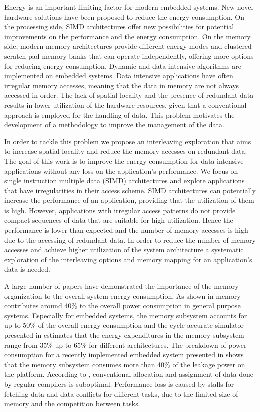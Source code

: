 Energy is an important limiting factor for modern embedded systems.
New novel hardware solutions have been proposed to reduce the energy consumption.
On the processing side, SIMD architectures offer new possibilities for potential improvements on the performance and the energy consumption.
On the memory side, modern memory architectures provide different energy modes and clustered scratch-pad memory banks that can operate independently, offering more options for reducing energy consumption.
Dynamic and data intensive algorithms are implemented on embedded systems.
Data intensive applications have often irregular memory accesses, meaning that the data in memory are not always accessed in order.
The lack of spatial locality and the presence of redundant data results in lower utilization of the hardware resources, given that a conventional approach is employed for the handling of data.
This problem motivates the development of a methodology to improve the management of the data.

In order to tackle this problem we propose an interleaving exploration that aims to increase spatial locality and reduce the memory accesses on redundant data.
The goal of this work is to improve the energy consumption for data intensive applications without any loss on the application's performance. 
We focus on single instruction multiple data (SIMD) architectures and explore applications that have irregularities in their access scheme. 
SIMD architectures can potentially increase the performance of an application, providing that the utilization of them is high. 
However, applications with irregular access patterns do not provide compact sequences of data that are suitable for high utilization. 
Hence the performance is lower than expected and the number of memory accesses is high due to the accessing of redundant data. 
In order to reduce the number of memory accesses and achieve higher utilization of the system architecture a systematic exploration of the interleaving options and memory mapping for an application's data is needed. 

A large number of papers have demonstrated the importance of the memory organization to the overall system energy consumption. 
As shown in \cite{Gonzalez1996} memory contributes around 40\% to the overall power consumption in general purpose systems. 
Especially for embedded systems, the memory subsystem accounts for up to 50\% of the overall energy consumption \cite{Che09} and the cycle-accurate simulator presented in \cite{Ben99} estimates that the energy expenditures in the memory subsystem range from 35\% up to 65\% for different architectures. 
The breakdown of power consumption for a recently implemented embedded system presented in \cite{Hul11} shows that the memory subsystem consumes more than 40\% of the leakage power on the platform. 
According to \cite{tcm}, conventional allocation and assignment of data done by regular compilers is suboptimal. 
Performance loss is caused by stalls for fetching data and data conflicts for different tasks, due to the limited size of memory and the competition between tasks. 


